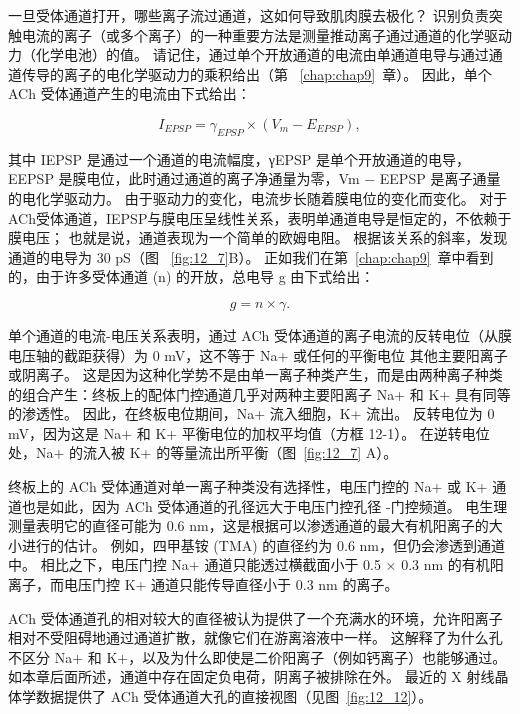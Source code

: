 一旦受体通道打开，哪些离子流过通道，这如何导致肌肉膜去极化？
识别负责突触电流的离子（或多个离子）的一种重要方法是测量推动离子通过通道的化学驱动力（化学电池）的值。
请记住，通过单个开放通道的电流由单通道电导与通过通道传导的离子的电化学驱动力的乘积给出（第 ~\ref{chap:chap9}~章）。 
因此，单个 ACh 受体通道产生的电流由下式给出：


\begin{equation}
	I_{EPSP} = \gamma_{EPSP}\times (V_m - E_{EPSP}),
\end{equation}


其中 IEPSP 是通过一个通道的电流幅度，γEPSP 是单个开放通道的电导，EEPSP 是膜电位，此时通过通道的离子净通量为零，Vm − EEPSP 是离子通量的电化学驱动力。
由于驱动力的变化，电流步长随着膜电位的变化而变化。 
对于ACh受体通道，IEPSP与膜电压呈线性关系，表明单通道电导是恒定的，不依赖于膜电压；
也就是说，通道表现为一个简单的欧姆电阻。
根据该关系的斜率，发现通道的电导为 30 pS（图 ~\ref{fig:12_7}B）。
正如我们在第~\ref{chap:chap9}~章中看到的，由于许多受体通道 (n) 的开放，总电导 g 由下式给出：


\begin{equation}
	g = n \times \gamma.
\end{equation}


单个通道的电流-电压关系表明，通过 ACh 受体通道的离子电流的反转电位（从膜电压轴的截距获得）为 0 mV，这不等于 Na+ 或任何的平衡电位 其他主要阳离子或阴离子。
这是因为这种化学势不是由单一离子种类产生，而是由两种离子种类的组合产生：终板上的配体门控通道几乎对两种主要阳离子 Na+ 和 K+ 具有同等的渗透性。
因此，在终板电位期间，Na+ 流入细胞，K+ 流出。
反转电位为 0 mV，因为这是 Na+ 和 K+ 平衡电位的加权平均值（方框 12-1）。
在逆转电位处，Na+ 的流入被 K+ 的等量流出所平衡（图~\ref{fig:12_7} A）。


终板上的 ACh 受体通道对单一离子种类没有选择性，电压门控的 Na+ 或 K+ 通道也是如此，因为 ACh 受体通道的孔径远大于电压门控孔径 -门控频道。
电生理测量表明它的直径可能为 0.6 nm，这是根据可以渗透通道的最大有机阳离子的大小进行的估计。
例如，四甲基铵 (TMA) 的直径约为 0.6 nm，但仍会渗透到通道中。
相比之下，电压门控 Na+ 通道只能透过横截面小于 0.5 × 0.3 nm 的有机阳离子，而电压门控 K+ 通道只能传导直径小于 0.3 nm 的离子。


ACh 受体通道孔的相对较大的直径被认为提供了一个充满水的环境，允许阳离子相对不受阻碍地通过通道扩散，就像它们在游离溶液中一样。
这解释了为什么孔不区分 Na+ 和 K+，以及为什么即使是二价阳离子（例如钙离子）也能够通过。
如本章后面所述，通道中存在固定负电荷，阴离子被排除在外。
最近的 X 射线晶体学数据提供了 ACh 受体通道大孔的直接视图（见图~\ref{fig:12_12}）。


